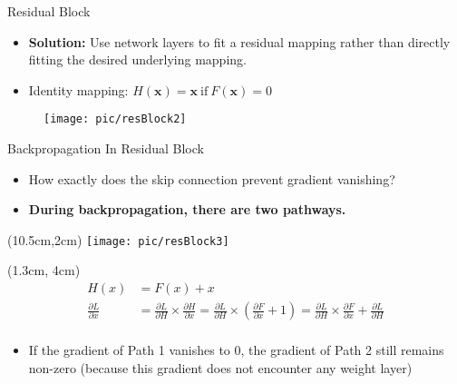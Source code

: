 \documentclass[serif, aspectratio=169]{beamer}
\begin{document}
\begin{frame}{Residual Block}
	
	\begin{itemize}
		\item \textbf{Solution:} Use network layers to fit a residual mapping rather than directly fitting the desired underlying mapping.
		\item Identity mapping: $H(\mathbf{x}) = \mathbf{x} \ \text{if} \  F(\mathbf{x}) = 0$
	\end{itemize}
	
	\begin{figure}[htpb]
		\begin{center}
			\hspace{2cm} \texttt{[image: pic/resBlock2]}
		\end{center}
	\end{figure}

\end{frame}

\begin{frame}{Backpropagation In Residual Block}
	\begin{itemize}
		\item How exactly does the skip connection \newline prevent gradient vanishing?
		\item \textbf{During backpropagation, there are two pathways.}
	\end{itemize}
	
	\begin{textblock*}{5cm}(10.5cm,2cm) %
		\texttt{[image: pic/resBlock3]}
	\end{textblock*}

    \begin{textblock*}{10cm}(1.3cm, 4cm) 
		$$			
		\begin{aligned}
			H(x) & = F(x) + x \\
			\frac{\partial L}{\partial x} & = \frac{\partial L}{\partial H} \times \frac{\partial H}{\partial x} = \frac{\partial L}{\partial H} \times \left( \frac{\partial F}{\partial x} + 1 \right) = \frac{\partial L}{\partial H} \times \frac{\partial F}{\partial x} + \frac{\partial L}{\partial H} \\
		\end{aligned}
		$$
	\end{textblock*}
	
	\vspace{2.2cm}
	\begin{itemize}
		\item If the gradient of Path 1 vanishes to 0, the gradient of \newline Path 2 still remains non-zero (because this gradient \newline  does not encounter any weight layer)
	\end{itemize}
\end{frame}
\end{document}
